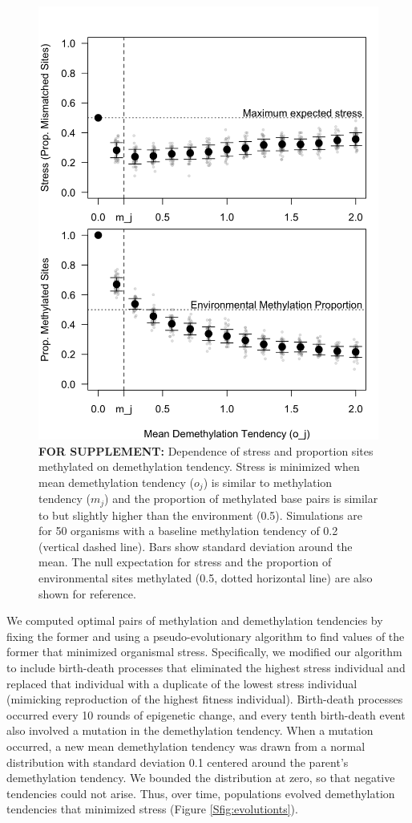 \documentclass{article}
\begin{document}
\begin{figure}
    \centering
    \includegraphics[width=0.8 \textwidth]{Figures/Fig_DemethDependence.png}
    \caption{\textbf{FOR SUPPLEMENT:} Dependence of stress and proportion sites methylated on demethylation tendency. Stress is minimized when mean demethylation tendency ($o_j$) is similar to methylation tendency ($m_j$) and the proportion of methylated base pairs is similar to but slightly higher than the environment (0.5). Simulations are for 50 organisms with a baseline methylation tendency of 0.2 (vertical dashed line). Bars show standard deviation around the mean. The null expectation for stress and the proportion of environmental sites methylated (0.5, dotted horizontal line) are also shown for reference. }
    \label{fig:methylmismatch}
\end{figure}

We computed optimal pairs of methylation and demethylation tendencies by fixing the former and using a pseudo-evolutionary algorithm to find values of the former that minimized organismal stress. Specifically, we modified our algorithm to include birth-death processes that eliminated the highest stress individual and replaced that individual with a duplicate of the lowest stress individual (mimicking reproduction of the highest fitness individual). Birth-death processes occurred every 10 rounds of epigenetic change, and every tenth birth-death event also involved a mutation in the demethylation tendency. When a mutation occurred, a new mean demethylation tendency was drawn from a normal distribution with standard deviation 0.1 centered around the parent's demethylation tendency. We bounded the distribution at zero, so that negative tendencies could not arise. Thus, over time, populations evolved demethylation tendencies that minimized stress (Figure \ref{Sfig:evolutionts}). %
\end{document}
